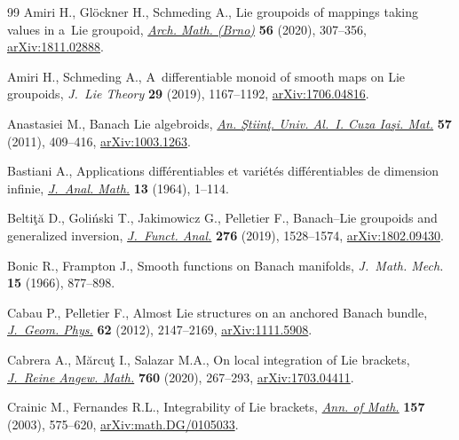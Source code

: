 \documentclass[11pt]{article}
\numberwithin{equation}{section}
\numberwithin{equation}{section}
\begin{document}
\begin{thebibliography}{99}
Amiri H., Gl\"ockner H., Schmeding A., Lie groupoids of mappings taking values
 in a~{L}ie groupoid,
 \href{https://doi.org/10.5817/am2020-5-307}{\textit{Arch. Math. (Brno)}}
 \textbf{56} (2020), 307--356,
 \href{http://arxiv.org/abs/1811.02888}{arXiv:1811.02888}.

Amiri H., Schmeding A., A~differentiable monoid of smooth maps on {L}ie
 groupoids, \textit{J.~Lie Theory} \textbf{29} (2019), 1167--1192,
 \href{http://arxiv.org/abs/1706.04816}{arXiv:1706.04816}.

Anastasiei M., Banach {L}ie algebroids,
 \href{https://doi.org/10.2478/v10157-011-0035-y}{\textit{An. \c{S}tiin\c{t}.
 Univ. Al.~I. Cuza Ia\c{s}i. Mat.}} \textbf{57} (2011), 409--416,
 \href{http://arxiv.org/abs/1003.1263}{arXiv:1003.1263}.

Bastiani A., Applications diff\'erentiables et vari\'et\'es diff\'erentiables
 de dimension infinie,
 \href{https://doi.org/10.1007/BF02786619}{\textit{J.~Anal. Math.}}
 \textbf{13} (1964), 1--114.

Belti\c{t}\u{a} D., Goli\'nski T., Jakimowicz G., Pelletier F., Banach--{L}ie
 groupoids and generalized inversion,
 \href{https://doi.org/10.1016/j.jfa.2018.12.002}{\textit{J.~Funct. Anal.}}
 \textbf{276} (2019), 1528--1574,
 \href{http://arxiv.org/abs/1802.09430}{arXiv:1802.09430}.

Bonic R., Frampton J., Smooth functions on {B}anach manifolds, \textit{J.~Math.
 Mech.} \textbf{15} (1966), 877--898.

Cabau P., Pelletier F., Almost {L}ie structures on an anchored {B}anach bundle,
 \href{https://doi.org/10.1016/j.geomphys.2012.06.005}{\textit{J.~Geom.
 Phys.}} \textbf{62} (2012), 2147--2169,
 \href{http://arxiv.org/abs/1111.5908}{arXiv:1111.5908}.

Cabrera A., M\u{a}rcu\c{t} I., Salazar M.A., On local integration of {L}ie
 brackets, \href{https://doi.org/10.1515/crelle-2018-0011}{\textit{J.~Reine
 Angew. Math.}} \textbf{760} (2020), 267--293,
 \href{http://arxiv.org/abs/1703.04411}{arXiv:1703.04411}.

Crainic M., Fernandes R.L., Integrability of {L}ie brackets,
 \href{https://doi.org/10.4007/annals.2003.157.575}{\textit{Ann. of Math.}}
 \textbf{157} (2003), 575--620,
 \href{http://arxiv.org/abs/math.DG/0105033}{arXiv:math.DG/0105033}.


\end{thebibliography}
\end{document}
